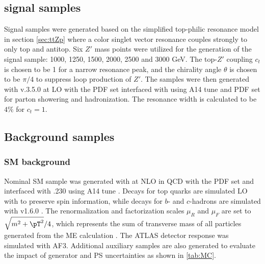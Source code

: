 \documentclass[../thesis.tex]{subfiles}
\begin{document}
\subsection{\ttZp signal samples}
Signal \ttZp samples were generated based on the simplified top-philic resonance model in section \ref{sec:ttZp} where a color singlet vector resonance couples strongly to only top and antitop. Six $Z'$ mass points were utilized for the generation of the signal sample: 1000, 1250, 1500, 2000, 2500 and 3000 GeV. The top-$Z'$ coupling $c_t$ is chosen to be 1 for a narrow resonance peak, and the chirality angle $\theta$ is chosen to be $\pi/4$ to suppress loop production of $Z'$. The samples were then generated with \mgamc v.3.5.0 \citep{Alwall:2014hca} at \acs{LO} with the \nnpdfonelo \citep{Ball:2014uwa} \acs{PDF} set interfaced with \pythia \citep{Sjostrand:2014zea} using A14 tune and \nnpdftwo \acs{PDF} set for parton showering and hadronization. The resonance width is calculated to be $4\%$ for $c_t=1$. \\

\subsection{Background samples}

\subsubsection*{\acs{SM} \tttt background}
Nominal \acs{SM} \tttt sample was generated with \mgamc \citep{Alwall:2014hca} at \acs{NLO} in \acs{QCD} with the \nnpdfnlo \citep{Ball:2014uwa} \acs{PDF} set and interfaced with \pythia.230 \citep{Sjostrand:2014zea} using A14 tune \citep{ATL-PHYS-PUB-2014-021}. Decays for top quarks are simulated \acs{LO} with \madspin \citep{Frixione:2007zp, Artoisenet:2012st} to preserve spin information, while decays for $b$- and $c$-hadrons are simulated with \evtgen v1.6.0 \citep{Lange:2001uf}. The renormalization and factorization scales $\mu_R$ and $\mu_F$ are set to $\sqrt{m^2+\pT^2}/4$, which represents the sum of transverse mass of all particles generated from the \acs{ME} calculation \citep{Frederix:2017wme}. The ATLAS detector response was simulated with \acs{AF3}. Additional auxiliary \tttt samples are also generated to evaluate the impact of generator and \acs{PS} uncertainties as shown in \ref{tab:MC}.
\end{document}
